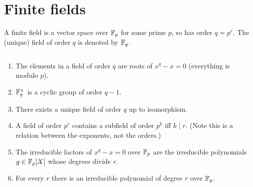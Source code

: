 \section{Finite fields}
A finite field is a vector space over $\mathbb{F}_p$ for some prime $p$, so has order $q=p^r$. The (unique) field of order $q$ is denoted by $\mathbb{F}_q$.
\begin{pr}\label{finite-field-pr}$\,$
\begin{enumerate}
\item
The elements in a field of order $q$ are roots of $x^q-x=0$ (everything is modulo $p$).
\item%
$\mathbb{F}_q^{\times}$ is a cyclic group of order $q-1$. 
\item There exists a unique field of order $q$ up to isomorphism.
\item A field of order $p^r$ contains a subfield of order $p^k$ iff $k\mid r$. (Note this is a relation between the exponents, not the orders.)
\item The irreducible factors of $x^{q}-x=0$ over $\mathbb{F}_p$ are the irreducible polynomials $g\in \mathbb{F}_p[X]$ whose degrees divide $r$.
\item For every $r$ there is an irreducible polynomial of degree $r$ over $\mathbb{F}_p$.
\end{enumerate}
\end{pr}
